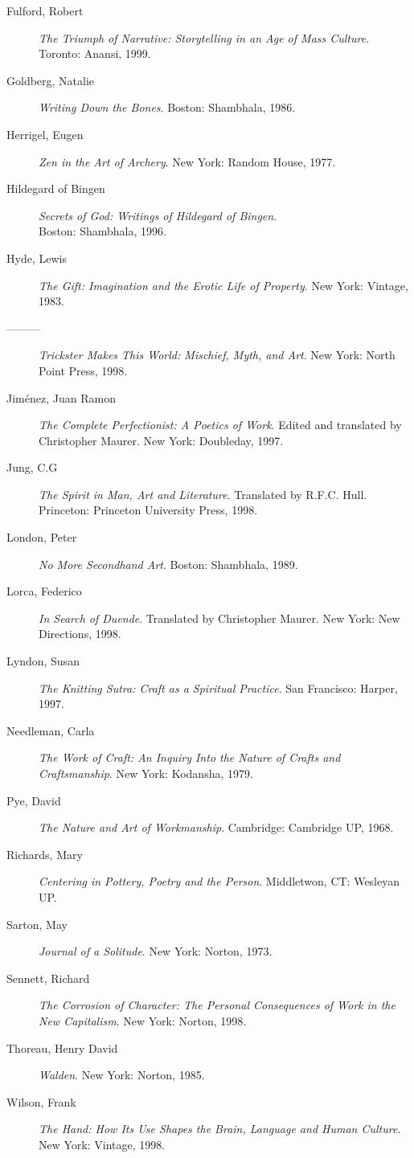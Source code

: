 \documentclass[letterpaper,oneside]{memoir}
\begin{document}
\begin{description}
\item [Fulford, Robert] \textit{The Triumph of Narrative: Storytelling in an Age of Mass Culture}. Toronto: Anansi, 1999.
\item [Goldberg, Natalie] \textit{Writing Down the Bones}. Boston: Shambhala, 1986.
\item [Herrigel, Eugen] \textit{Zen in the Art of Archery}. New York: Random House, 1977.
\item [Hildegard of Bingen] \textit{Secrets of God: Writings of Hildegard of Bingen}.\\ Boston: Shambhala, 1996.
\item [Hyde, Lewis] \textit{The Gift: Imagination and the Erotic Life of Property}. New York: Vintage, 1983.
\item [---------] \textit{Trickster Makes This World: Mischief, Myth, and Art}. New York: North Point Press, 1998.
\item [Jim\'enez, Juan Ramon] \textit{The Complete Perfectionist: A Poetics of Work}. Edited and translated by Christopher Maurer. New York: Doubleday, 1997.
\item [Jung, C.G] \textit{The Spirit in Man, Art and Literature}. Translated by R.F.C. Hull. Princeton: Princeton University Press, 1998.
\item [London, Peter] \textit{No More Secondhand Art}. Boston: Shambhala, 1989.
\item [Lorca, Federico] \textit{In Search of Duende}. Translated by Christopher Maurer. New York: New Directions, 1998.
\item [Lyndon, Susan] \textit{The Knitting Sutra: Craft as a Spiritual Practice}. San Francisco: Harper, 1997.
\item [Needleman, Carla] \textit{The Work of Craft: An Inquiry Into the Nature of Crafts and Craftsmanship}. New York: Kodansha, 1979.
\item [Pye, David] \textit{The Nature and Art of Workmanship}. Cambridge: Cambridge UP, 1968.
\item [Richards, Mary] \textit{Centering in Pottery, Poetry and the Person}. Middletwon, CT: Wesleyan UP.
\item [Sarton, May] \textit{Journal of a Solitude}. New York: Norton, 1973.
\item [Sennett, Richard] \textit{The Corrosion of Character: The Personal Consequences of Work in the New Capitalism}. New York: Norton, 1998.
\item [Thoreau, Henry David] \textit{Walden}. New York: Norton, 1985.
\item [Wilson, Frank] \textit{The Hand: How Its Use Shapes the Brain, Language and Human Culture}. New York: Vintage, 1998.
\end{description}
\newpage
\end{document}
